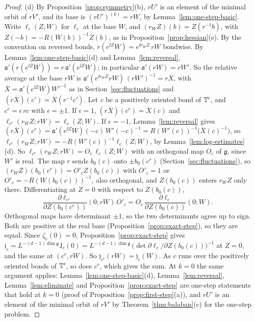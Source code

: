 \begin{proof}
(d) By Proposition~\ref{prop:symmetry}(b), $rU'$ is an element of the minimal orbit of $rV'$, and its base is $(rU')^{(k)}=rW$, by Lemma~\ref{lem:one-step-basic}. Write $\ell_c(Z;W)$ for $\ell_c$ at the base $W$, and $(r_WZ)(b)=Z(r^{-1}b)$, with $Z(-b)=-R(W(b))^{-1}Z(b)$, as in Proposition~\ref{prop:hessian}(e). By the convention on reversed bonds, $r(e^{\ii Z}W)=e^{\ii r_WZ}\,rW$ bondwise. By Lemma~\ref{lem:one-step-basic}(d) and Lemma~\ref{lem:reversal}, $\mathfrak a'(r(e^{\ii Z}W))=r\,\mathfrak a'(e^{\ii Z}W)$; in particular $\mathfrak a'(rW)=rW'$. So the relative average at the base $rW$ is $\mathfrak a'(e^{\ii r_WZ}rW)\,(rW')^{-1}=r\overline X$, with $\overline X=\mathfrak a'(e^{\ii Z}W)W'^{-1}$ as in Section~\ref{sec:fluctuations} and $(r\overline X)(c')=\overline X(r^{-1}c')$. Let $c$ be a positively oriented bond of $\mathbb T'$, and $c^r=\epsilon\,rc$ with $\epsilon=\pm1$. If $\epsilon=1$, $(r\overline X)(c^r)=\overline X(c)$ and $\ell_{c^r}(r_WZ;rW)=\ell_c(Z;W)$. If $\epsilon=-1$, Lemma~\ref{lem:reversal} gives $(r\overline X)(c^r)=\mathfrak a'(e^{\ii Z}W)(-c)\,W'(-c)^{-1}=R(W'(c))^{-1}\big(\overline X(c)^{-1}\big)$, so $\ell_{c^r}(r_WZ;rW)=-R(W'(c))^{-1}\ell_c(Z;W)$, by Lemma~\ref{lem:log-estimates}(d). So $\ell_{c^r}(r_WZ;rW)=O_c\,\ell_c(Z;W)$ with an orthogonal map $O_c$ of $\mathfrak g$, since $W'$ is real. The map $r$ sends $b_0(c)$ onto $\pm b_0(c^r)$ (Section~\ref{sec:fluctuations}), so $(r_WZ)(b_0(c^r))=O'_cZ(b_0(c))$ with $O'_c=1$ or $O'_c=-R(W(b_0(c)))^{-1}$, also orthogonal, and $Z(b_0(c))$ enters $r_WZ$ only there. Differentiating at $Z=0$ with respect to $Z(b_0(c))$,
\[
\frac{\partial\ell_{c^r}}{\partial Z(b_0(c^r))}(0;rW)\,O'_c=O_c\,\frac{\partial\ell_c}{\partial Z(b_0(c))}(0;W).
\]
Orthogonal maps have determinant $\pm1$, so the two determinants agree up to sign. Both are positive at the real base (Proposition~\ref{prop:exact-step}), so they are equal. Since $\zeta_c(0)=0$, Proposition~\ref{prop:exact-step} gives $\mathfrak j_c=L^{-(d-1)\dim\mathfrak g}\mathsf J_c(0)=L^{-(d-1)\dim\mathfrak g}\,\big(\det\partial\ell_c/\partial Z(b_0(c))\big)^{-1}$ at $Z=0$, and the same at $(c^r,rW)$. So $\mathfrak j_{c^r}(rW)=\mathfrak j_c(W)$. As $c$ runs over the positively oriented bonds of $\mathbb T'$, so does $c^r$, which gives the sum. At $k=0$ the same argument applies: Lemma~\ref{lem:one-step-basic}(d), Lemma~\ref{lem:reversal}, Lemma~\ref{lem:eliminate} and Proposition~\ref{prop:exact-step} are one-step statements that hold at $k=0$ (proof of Proposition~\ref{prop:first-step}(a)), and $rU'$ is an element of the minimal orbit of $rV'$ by Theorem~\ref{thm:balaban}(c) for the one-step problem.
\end{proof}

